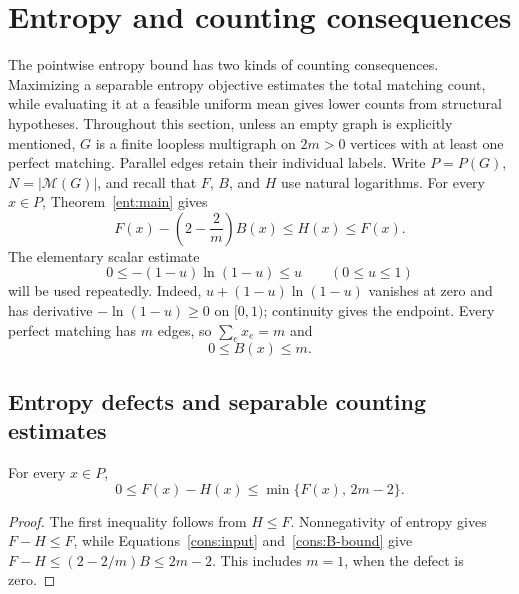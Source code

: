 \section{Entropy and counting consequences}
\label{cons:section}

The pointwise entropy bound has two kinds of counting consequences.
Maximizing a separable entropy objective estimates the total matching
count, while evaluating it at a feasible uniform mean gives lower counts
from structural hypotheses. Throughout this section, unless
an empty graph is explicitly mentioned, \(G\) is a finite loopless
multigraph on \(2m>0\) vertices with at least one perfect matching.
Parallel edges retain their individual labels. Write \(P=P(G)\),
\(N=|\mathcal M(G)|\), and recall that \(F\), \(B\), and \(H\) use
natural logarithms. For every \(x\in P\), Theorem~\ref{ent:main} gives
\begin{equation}
 \label{cons:input}
 F(x)-\left(2-\frac2m\right)B(x)\le H(x)\le F(x).
\end{equation}
The elementary scalar estimate
\begin{equation}
 \label{cons:complement}
 0\le -(1-u)\ln(1-u)\le u\qquad(0\le u\le1)
\end{equation}
will be used repeatedly. Indeed,
\(u+(1-u)\ln(1-u)\) vanishes at zero and has derivative
\(-\ln(1-u)\ge0\) on \([0,1)\); continuity gives the endpoint.
Every perfect matching has \(m\) edges, so \(\sum_e x_e=m\) and
\begin{equation}
 \label{cons:B-bound}
                         0\le B(x)\le m.
\end{equation}

\subsection{Entropy defects and separable counting estimates}

\begin{corollary}
\label{cons:defect}
For every \(x\in P\),
\begin{equation}
 \label{cons:defect-bound}
 0\le F(x)-H(x)
 \le \min\{F(x),\,2m-2\}.
\end{equation}
\end{corollary}

\begin{proof}
The first inequality follows from \(H\le F\). Nonnegativity of
entropy gives \(F-H\le F\), while
Equations~\eqref{cons:input} and~\eqref{cons:B-bound} give
\(F-H\le(2-2/m)B\le2m-2\).
This includes \(m=1\), when the defect is zero.
\end{proof}

